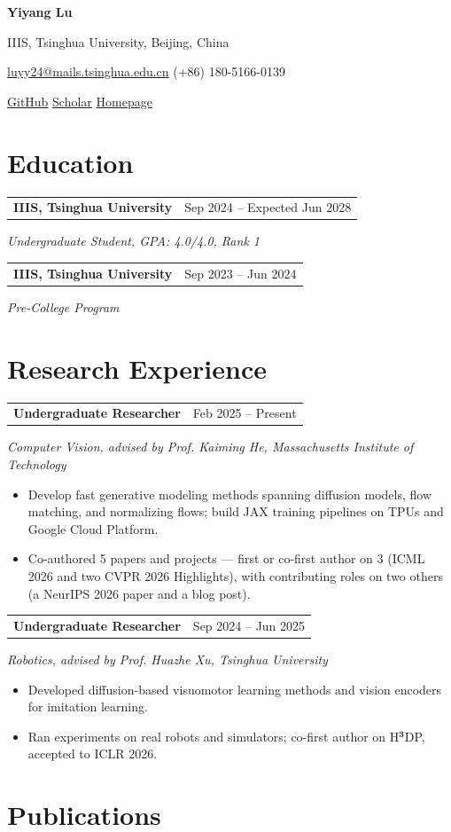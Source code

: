 \documentclass[a4paper,10pt]{article}
\makeatletter
\newcommand{\Header}[7]{%
    {\namefont\bfseries\fontsize{25}{27}\selectfont #1}\par
    \vspace{0.28em}
    {\headerfont\small #2}\par
    {\headerfont\small \href{mailto:#3}{#3} \quad \textbar \quad #4}\par
    {\headerfont\small \href{#5}{GitHub} \quad \textbar \quad \href{#6}{Scholar} \quad \textbar \quad \href{#7}{Homepage}}\par
    \vspace{0.45em}
}
\newcommand{\EntryHeader}[2]{%
    \begin{tabularx}{\textwidth}{@{}Xr@{}}
        #1 & #2 \\
    \end{tabularx}\par
}
\newcommand{\EducationEntry}[4]{%
    \EntryHeader{\textbf{#1}}{#3}
    \textit{#2}\par
    \if\relax\detokenize{#4}\relax\else
        #4\par
    \fi
    \vspace{0.2em}
}
\newcommand{\ResearchEntry}[4]{%
    \EntryHeader{\textbf{#1}}{#3}
    \textit{#2}\par
    #4
    \vspace{0.25em}
}
\makeatother
\begin{document}
\Header
    {Yiyang Lu}
    {IIIS, Tsinghua University, Beijing, China}
    {luyy24@mails.tsinghua.edu.cn}
    {(+86) 180-5166-0139}
    {https://github.com/Lyy-iiis}
    {https://scholar.google.com/citations?view_op=list_works&hl=en&user=slA2hCMAAAAJ}
    {https://lyy-iiis.github.io/}

\section{Education}
\EducationEntry
    {IIIS, Tsinghua University}
    {Undergraduate Student, GPA: 4.0/4.0, Rank 1}
    {Sep 2024 -- Expected Jun 2028}
    {}

\EducationEntry
    {IIIS, Tsinghua University}
    {Pre-College Program}
    {Sep 2023 -- Jun 2024}
    {}

\section{Research Experience}
\ResearchEntry
    {Undergraduate Researcher}
    {Computer Vision, advised by Prof. Kaiming He, Massachusetts Institute of Technology}
    {Feb 2025 -- Present}
    {
        \begin{itemize}
            \item Develop fast generative modeling methods spanning diffusion models, flow matching, and normalizing flows; build JAX training pipelines on TPUs and Google Cloud Platform.
            \item Co-authored 5 papers and projects --- first or co-first author on 3 (ICML 2026 and two CVPR 2026 Highlights), with contributing roles on two others (a NeurIPS 2026 paper and a blog post).
        \end{itemize}
    }

\ResearchEntry
    {Undergraduate Researcher}
    {Robotics, advised by Prof. Huazhe Xu, Tsinghua University}
    {Sep 2024 -- Jun 2025}
    {
        \begin{itemize}
            \item Developed diffusion-based visuomotor learning methods and vision encoders for imitation learning.
            \item Ran experiments on real robots and simulators; co-first author on H$^\mathbf{3}$DP, accepted to ICLR 2026.
        \end{itemize}
    }

\section{Publications}
\end{document}
